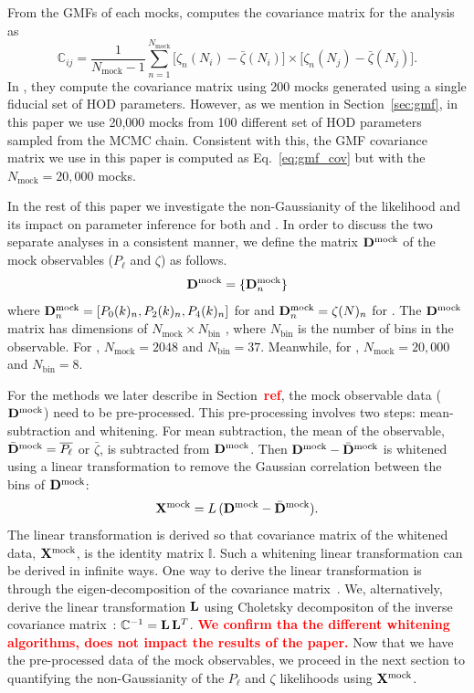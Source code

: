 \documentclass[12pt, letterpaper, preprint]{aastex}
\newcommand{\beq}{\begin{equation}}
\newcommand{\eeq}{\end{equation}}
\newcommand{\todo}[1]{{\bf \textcolor{red}{#1}}}
\newcommand{\Dmock}{{\bf D}^\mathrm{mock}}
\newcommand{\Xmock}{{\bf X}^\mathrm{mock}}
\newcommand{\Beut}{\citetalias{beutler2017}}
\newcommand{\Sinh}{\citetalias{sinha2017a}}
\begin{document}
From the GMFs of each mocks, \cite{sinha2017a} computes the covariance
matrix for the analysis as 
\beq \label{eq:gmf_cov} 
\mathbb{C}_{ij} = \frac{1}{N_\mathrm{mock} -1} \sum\limits_{n=1}^{N_\mathrm{mock}} \big[\zeta_n(N_i) -  \bar{\zeta}(N_i)\big] \times
    \big[\zeta_n(N_j) -  \bar{\zeta}(N_j)\big].
\eeq
In \cite{sinha2017a}, they compute the covariance matrix using 200 mocks
generated using a single fiducial set of HOD parameters. However, as we 
mention in Section~\ref{sec:gmf}, in this paper we use 20,000 mocks from 
100 different set of HOD parameters sampled from the MCMC chain. Consistent
with this, the GMF covariance matrix we use in this paper is computed as
Eq.~\ref{eq:gmf_cov} but with the $N_\mathrm{mock} = 20,000$ mocks. 

In the rest of this paper we investigate the non-Gaussianity of the 
likelihood and its impact on parameter inference for both \cite{beutler2017} 
and \cite{sinha2017a}. In order to discuss the two separate analyses
in a consistent manner, we define the matrix $\Dmock$ of 
the mock observables ($P_\ell$ and $\zeta$) as follows. 
\beq
\Dmock = \{{\bf D}^\mathrm{mock}_n\}
\eeq
where $\Dmock_n = [P_0(k)_n,P_2(k)_n,P_4(k)_n]$ for 
\cite{beutler2017} and $\Dmock_n = \zeta(N)_n$ for 
\cite{sinha2017a}. The $\Dmock$ matrix has dimensions of 
$N_\mathrm{mock} \times N_\mathrm{bin}$ , where $N_\mathrm{bin}$
is the number of bins in the observable. For \Beut, 
$N_\mathrm{mock} = 2048$ and $N_\mathrm{bin} = 37$. Meanwhile, 
for \Sinh, $N_\mathrm{mock} = 20,000$ and $N_\mathrm{bin} = 8$.

For the methods we later describe in Section~\todo{ref}, the mock 
observable data ($\Dmock$) need to be pre-processed. This pre-processing
involves two steps: mean-subtraction and whitening. For mean subtraction, 
the mean of the observable, $\bar{\bf D}^\mathrm{mock} = \overline{P_\ell}$ or 
$\bar{\zeta}$, is subtracted from $\Dmock$. Then $\Dmock - \bar{\bf D}^\mathrm{mock}$ 
is whitened using a linear transformation to remove the Gaussian correlation
between the bins of $\Dmock$: 
\beq
\Xmock = L\,(\Dmock - \bar{\bf D}^\mathrm{mock}). 
\eeq
The linear transformation is derived so that covariance matrix of the whitened 
data, $\Xmock$, is the identity matrix $\mathbb{I}$. Such a whitening linear 
transformation can be derived in infinite ways. 
One way to derive the linear transformation is through the eigen-decomposition
of the covariance matrix~\citep[\emph{e.g.}][]{hartlap2009, sellentin2017}. We, alternatively, 
derive the linear transformation ${\bf L}$ using Choletsky decompositon of the 
inverse covariance matrix~\citep{Press:1992:NRC:148286}: 
$\mathbb{C}^{-1} = {\bf L}\,{\bf L}^T$. \todo{We confirm tha the different 
whitening algorithms, does not impact the results of the paper.}
Now that we have the pre-processed data of the mock observables, 
we proceed in the next section to quantifying the non-Gaussianity of the 
$P_\ell$ and $\zeta$ likelihoods using $\Xmock$. 
\end{document}
